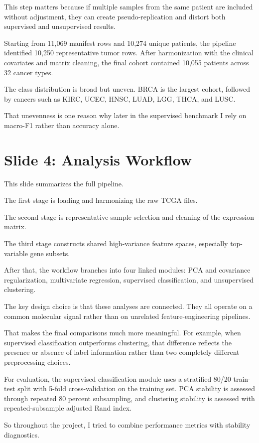 \documentclass[12pt]{article}
\begin{document}
This step matters because if multiple samples from the same patient are included without adjustment, they can create pseudo-replication and distort both supervised and unsupervised results.

Starting from 11,069 manifest rows and 10,274 unique patients, the pipeline identified 10,250 representative tumor rows. After harmonization with the clinical covariates and matrix cleaning, the final cohort contained 10,055 patients across 32 cancer types.

The class distribution is broad but uneven. BRCA is the largest cohort, followed by cancers such as KIRC, UCEC, HNSC, LUAD, LGG, THCA, and LUSC.

That unevenness is one reason why later in the supervised benchmark I rely on macro-F1 rather than accuracy alone.

\section{Slide 4: Analysis Workflow}
This slide summarizes the full pipeline.

The first stage is loading and harmonizing the raw TCGA files.

The second stage is representative-sample selection and cleaning of the expression matrix.

The third stage constructs shared high-variance feature spaces, especially top-variable gene subsets.

After that, the workflow branches into four linked modules: PCA and covariance regularization, multivariate regression, supervised classification, and unsupervised clustering.

The key design choice is that these analyses are connected. They all operate on a common molecular signal rather than on unrelated feature-engineering pipelines.

That makes the final comparisons much more meaningful. For example, when supervised classification outperforms clustering, that difference reflects the presence or absence of label information rather than two completely different preprocessing choices.

For evaluation, the supervised classification module uses a stratified 80/20 train-test split with 5-fold cross-validation on the training set. PCA stability is assessed through repeated 80 percent subsampling, and clustering stability is assessed with repeated-subsample adjusted Rand index.

So throughout the project, I tried to combine performance metrics with stability diagnostics.
\end{document}
